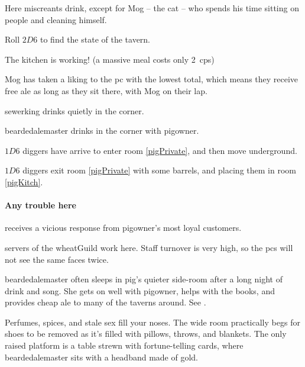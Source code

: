 \begin{multicols}{2}

Here miscreants drink, except for Mog -- the cat -- who spends his time sitting on people and cleaning himself.

Roll $2D6$ to find the state of the tavern.

\begin{dlist}
  \item
  The kitchen is working!
  (a massive meal costs only 2~\glspl{cp})
  \item
  Mog has taken a liking to the \gls{pc} with the lowest  total, which means they receive free ale as long as they sit there, with Mog on their lap.
  \item
  \Gls{sewerking} drinks quietly in the corner.
  \item
  \Gls{beardedalemaster} drinks in the corner with \gls{pigowner}.
  \item
  $1D6$ \glspl{digger} have arrive to enter room \vref{pigPrivate}, and then move underground.
  \item
  $1D6$ \glspl{digger} exit room \ref{pigPrivate} with some barrels, and placing them in room \vref{pigKitch}.
\end{dlist}

\paragraph{Any trouble here}
receives a vicious response from \gls{pigowner}'s most loyal customers.


\pigowner


\Glspl{server} of the \gls{wheatGuild} work here.
Staff turnover is very high, so the \glspl{pc} will not see the same faces twice.


\Gls{beardedalemaster} often sleeps in \gls{pig}'s quieter side-room after a long night of drink and song.
She gets on well with \gls{pigowner}, helps with the books, and provides cheap ale to many of the taverns around.
See .

\begin{boxtext}
  Perfumes, spices, and stale sex fill your noses.
  The wide room practically begs for shoes to be removed as it's filled with pillows, throws, and blankets.
  The only raised platform is a table strewn with fortune-telling cards, where \gls{beardedalemaster} sits with a headband made of gold.
\end{boxtext}


\end{multicols}
